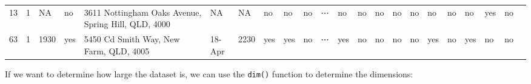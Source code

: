 \documentclass[11pt]{article}
\begin{document}
\begin{tabular}{r|lllllllllllllllllllll}
	 13                                                  & 1                                                   &   NA                                                & no                                                  & 3611 Nottingham Oaks Avenue, Spring Hill, QLD, 4000 & NA                                                  &   NA                                                & no                                                  & no                                                  & no                                                  & ⋯                                                   & no                                                  & no                                                  & no                                                  & no                                                  & no                                                  & no                                                  & no                                                  & no                                                  & yes                                                 & no                                                 \\
	 63                                                  & 1                                                   & 1930                                                & yes                                                 & 5450 Cd Smith Way, New Farm, QLD, 4005              & 18-Apr                                              & 2230                                                & yes                                                 & yes                                                 & no                                                  & ⋯                                                   & yes                                                 & no                                                  & no                                                  & no                                                  & no                                                  & yes                                                 & no                                                  & yes                                                 & no                                                  & no                                                 \\
\end{tabular}


    
    If we want to determine how large the dataset is, we can use the
\texttt{dim()} function to determine the dimensions:
\end{document}
